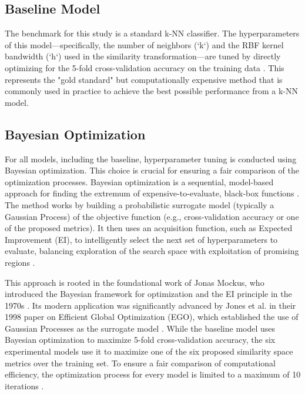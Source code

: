 \documentclass[conference]{IEEEtran}
\begin{document}
\subsection{Baseline Model}
The benchmark for this study is a standard k-NN classifier. The hyperparameters of this model—specifically, the number of neighbors (`k`) and the RBF kernel bandwidth (`h`) used in the similarity transformation—are tuned by directly optimizing for the 5-fold cross-validation accuracy on the training data \cite{b20}. This represents the "gold standard" but computationally expensive method that is commonly used in practice to achieve the best possible performance from a k-NN model.

\subsection{Bayesian Optimization}
For all models, including the baseline, hyperparameter tuning is conducted using Bayesian optimization. This choice is crucial for ensuring a fair comparison of the optimization processes. Bayesian optimization is a sequential, model-based approach for finding the extremum of expensive-to-evaluate, black-box functions \cite{b44, b45, b46}. The method works by building a probabilistic surrogate model (typically a Gaussian Process) of the objective function (e.g., cross-validation accuracy or one of the proposed metrics). It then uses an acquisition function, such as Expected Improvement (EI), to intelligently select the next set of hyperparameters to evaluate, balancing exploration of the search space with exploitation of promising regions \cite{b47, b48}.

This approach is rooted in the foundational work of Jonas Mockus, who introduced the Bayesian framework for optimization and the EI principle in the 1970s \cite{b47, b49}. Its modern application was significantly advanced by Jones et al. in their 1998 paper on Efficient Global Optimization (EGO), which established the use of Gaussian Processes as the surrogate model \cite{b50, b51, b52}. While the baseline model uses Bayesian optimization to maximize 5-fold cross-validation accuracy, the six experimental models use it to maximize one of the six proposed similarity space metrics over the training set. To ensure a fair comparison of computational efficiency, the optimization process for every model is limited to a maximum of 10 iterations \cite{b20}.
\end{document}
